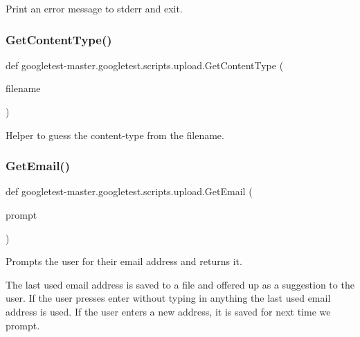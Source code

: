 \begin{DoxyVerb}Print an error message to stderr and exit.\end{DoxyVerb}
 \mbox{\label{namespacegoogletest-master_1_1googletest_1_1scripts_1_1upload_aa345cb0158210c30312dac0d71af1e9e}} 
\subsubsection{\texorpdfstring{GetContentType()}{GetContentType()}}
{\footnotesize\ttfamily def googletest-\/master.\+googletest.\+scripts.\+upload.\+Get\+Content\+Type (\begin{DoxyParamCaption}\item[{}]{filename }\end{DoxyParamCaption})}

\begin{DoxyVerb}Helper to guess the content-type from the filename.\end{DoxyVerb}
 \mbox{\label{namespacegoogletest-master_1_1googletest_1_1scripts_1_1upload_aabf8df42b9bd39c5511b604e04c8fd3f}} 
\subsubsection{\texorpdfstring{GetEmail()}{GetEmail()}}
{\footnotesize\ttfamily def googletest-\/master.\+googletest.\+scripts.\+upload.\+Get\+Email (\begin{DoxyParamCaption}\item[{}]{prompt }\end{DoxyParamCaption})}

\begin{DoxyVerb}Prompts the user for their email address and returns it.

The last used email address is saved to a file and offered up as a suggestion
to the user. If the user presses enter without typing in anything the last
used email address is used. If the user enters a new address, it is saved
for next time we prompt.\end{DoxyVerb}
 \mbox{\label{namespacegoogletest-master_1_1googletest_1_1scripts_1_1upload_a0d43430fe29dfdac2c8c24578249fd49}} 
